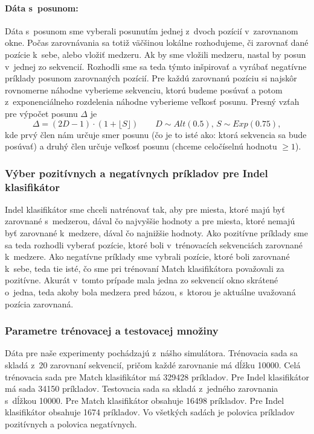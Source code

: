 \paragraph{Dáta s~posunom:} Dáta s~posunom sme vyberali posunutím jednej z~dvoch pozícií v~zarovnanom okne.
Počas zarovnávania sa totiž väčšinou lokálne rozhodujeme, či zarovnať dané pozície k~sebe, alebo vložiť medzeru. Ak by sme vložili medzeru, nastal by posun v~jednej zo sekvencií. Rozhodli sme sa teda týmto inšpirovať a vyrábať negatívne príklady posunom zarovnaných pozícií. Pre každú zarovnanú pozíciu si najskôr rovnomerne náhodne vyberieme sekvenciu, ktorú budeme posúvať a potom z~exponenciálneho rozdelenia náhodne vyberieme veľkosť posunu. Presný vzťah pre výpočet posunu $\Delta$ je
$$\Delta = \left(2D-1\right)\cdot \left(1+\lfloor S\rfloor\right)\qquad D\sim Alt(0.5),\, S\sim Exp(0.75),$$
kde prvý člen nám určuje smer posunu (čo je to isté ako: ktorá sekvencia sa bude posúvať) a druhý člen určuje veľkosť posunu (chceme celočíselnú hodnotu $\geq 1$).

\subsubsection{Výber pozitívnych a negatívnych príkladov pre Indel klasifikátor}

Indel klasifikátor sme chceli natrénovať tak, aby pre miesta, ktoré majú byť zarovnané s~medzerou, dával čo najvyššie hodnoty a pre miesta, ktoré nemajú byť zarovnané k~medzere, dával čo najnižšie hodnoty. Ako pozitívne príklady sme sa teda rozhodli vyberať pozície, ktoré boli v~trénovacích sekvenciách zarovnané k~medzere. Ako negatívne príklady sme vybrali pozície, ktoré boli zarovnané k~sebe, teda tie isté, čo sme pri trénovaní Match klasifikátora považovali za pozitívne. Akurát v~tomto prípade mala jedna zo sekvencií okno skrátené o~jedna, teda akoby bola medzera pred bázou, s~ktorou je aktuálne uvažovaná pozícia zarovnaná.

\subsubsection{Parametre trénovacej a testovacej množiny}
\label{subsec:clf-training-sets}
Dáta pre naše experimenty pochádzajú z~nášho simulátora. Trénovacia sada sa skladá z~20 zarovnaní sekvencií, pričom každé zarovnanie má dĺžku 10000. Celá trénovacia sada pre Match klasifikátor má 329428 príkladov. Pre Indel klasifikátor má sada 34150 príkladov.
Testovacia sada sa skladá z~jedného zarovnania s~dĺžkou 10000. Pre Match klasifikátor obsahuje 16498 príkladov. Pre Indel klasifikátor obsahuje 1674 príkladov.
Vo všetkých sadách je polovica príkladov pozitívnych a polovica negatívnych.

